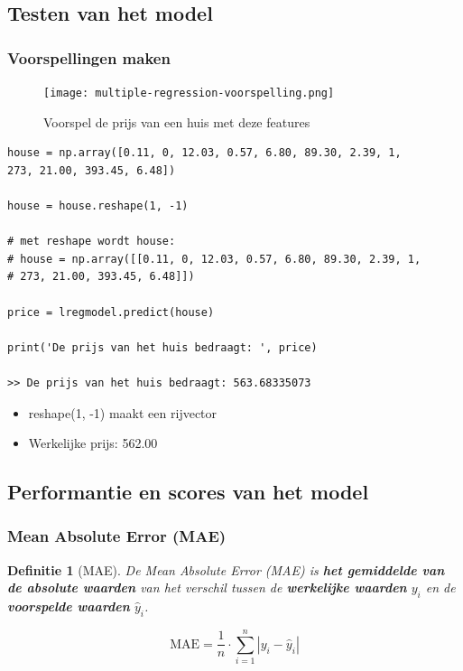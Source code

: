 \documentclass{article}
\newtheorem{theorem}{Definitie}[section]
\begin{document}
\subsection{Testen van het model}

\subsubsection{Voorspellingen maken}

\begin{figure}[H]
    \centering
    \texttt{[image: multiple-regression-voorspelling.png]}
    \caption{Voorspel de prijs van een huis met deze features}
\end{figure}

\begin{verbatim}
house = np.array([0.11, 0, 12.03, 0.57, 6.80, 89.30, 2.39, 1, 
273, 21.00, 393.45, 6.48])

house = house.reshape(1, -1)

# met reshape wordt house:
# house = np.array([[0.11, 0, 12.03, 0.57, 6.80, 89.30, 2.39, 1, 
# 273, 21.00, 393.45, 6.48]])

price = lregmodel.predict(house)

print('De prijs van het huis bedraagt: ', price)

>> De prijs van het huis bedraagt: 563.68335073
\end{verbatim}

\begin{itemize}
    \item reshape(1, -1) maakt een rijvector
    \item Werkelijke prijs: 562.00
\end{itemize}

\subsection{Performantie en scores van het model}

\subsubsection{Mean Absolute Error (MAE)}

\begin{theorem}[MAE]
De Mean Absolute Error (MAE) is \textbf{het gemiddelde van de absolute waarden} van het verschil
tussen de \textbf{werkelijke waarden} $y_i$ en de \textbf{voorspelde waarden} $\hat{y}_i$.

\begin{equation}
\text{MAE} = \frac{1}{n} \cdot \sum_{i=1}^n | y_i - \hat{y}_i |
\end{equation}
\end{theorem}
\end{document}
